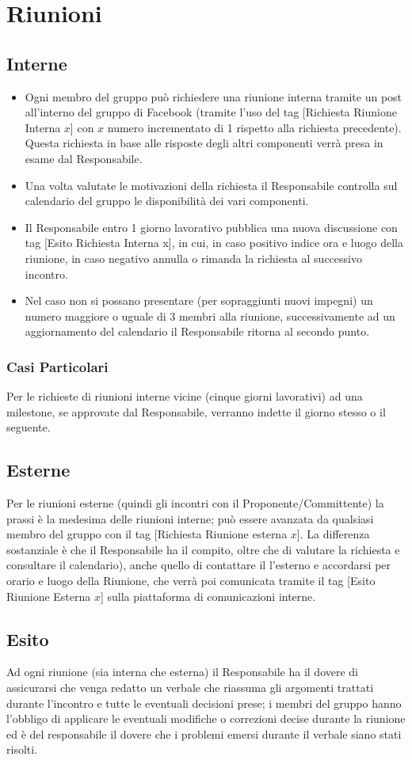 \section{Riunioni}{
	\subsection{Interne}{
		\begin{itemize}
			\item Ogni membro del gruppo può richiedere una riunione interna tramite un post all’interno del gruppo di Facebook (tramite l’uso del tag [Richiesta Riunione Interna $x$] con $x$ numero incrementato di 1 rispetto alla richiesta precedente). Questa richiesta  in base alle risposte degli altri componenti verrà presa in esame dal Responsabile.
			\item Una volta valutate le motivazioni della richiesta il Responsabile controlla sul calendario del gruppo le disponibilità dei vari componenti.
			\item Il Responsabile entro 1 giorno lavorativo pubblica una nuova discussione con tag [Esito Richiesta Interna x], in cui, in caso positivo indice ora e luogo della riunione, in caso negativo annulla o rimanda la richiesta al successivo incontro.
			\item Nel caso non si possano presentare (per sopraggiunti nuovi impegni) un numero maggiore o uguale di 3 membri alla riunione, successivamente ad un aggiornamento del calendario il Responsabile ritorna al secondo punto.
		\end{itemize}
		\subsubsection{Casi Particolari}{
			Per le richieste di riunioni interne vicine (cinque giorni lavorativi) ad una milestone, se approvate dal Responsabile, verranno indette il giorno stesso o il seguente.
		}
	}
	\subsection{Esterne}{
		Per le riunioni esterne (quindi gli incontri con il Proponente/Committente) la prassi è la medesima delle riunioni interne; può essere avanzata da qualsiasi membro del gruppo con il tag [Richiesta Riunione esterna $x$].
		La differenza sostanziale è che il Responsabile ha il compito, oltre che di valutare la richiesta e consultare il calendario), anche quello di contattare il l’esterno e accordarsi per orario e luogo della Riunione, che verrà poi comunicata tramite il tag [Esito Riunione Esterna $x$] sulla piattaforma di comunicazioni interne.
		}
	\subsection{Esito}{
		Ad ogni riunione (sia interna che esterna) il Responsabile ha il dovere di assicurarsi che venga redatto un verbale che riassuma gli argomenti trattati durante l’incontro e tutte le eventuali decisioni prese; i membri del gruppo hanno l’obbligo di applicare le eventuali modifiche o correzioni decise durante la riunione ed è del responsabile il dovere che i problemi emersi durante il verbale siano stati risolti.
		}
}